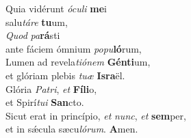 \evenverse Quia vidérunt \textit{ó}\textit{cu}\textit{li} \textbf{me}i~\*\\
\evenverse salu\textit{tá}\textit{re} \textbf{tu}um,\\
\oddverse \textit{Quod} \textit{pa}\textbf{rá}sti~\*\\
\oddverse ante fáciem ómnium \textit{po}\textit{pu}\textbf{ló}rum,\\
\evenverse Lumen ad revela\textit{ti}\textit{ó}\textit{nem} \textbf{Gén}\textbf{ti}um,~\*\\
\evenverse et glóriam plebis \textit{tu}\textit{æ} \textbf{Is}\textbf{ra}ël.\\
\oddverse Glória \textit{Pa}\textit{tri}, \textit{et} \textbf{Fí}\textbf{li}o,~\*\\
\oddverse et Spirí\textit{tu}\textit{i} \textbf{San}cto.\\
\evenverse Sicut erat in princípio, \textit{et} \textit{nunc}, \textit{et} \textbf{sem}per,~\*\\
\evenverse et in sǽcula sæcu\textit{ló}\textit{rum}. \textbf{A}men.\\
